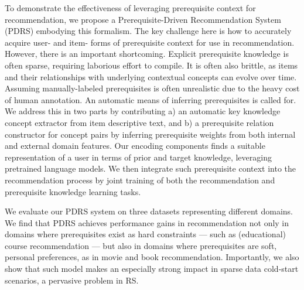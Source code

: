 To demonstrate the effectiveness of leveraging prerequisite context for recommendation, we propose a Prerequisite-Driven Recommendation System (PDRS) embodying this  formalism. 
The key challenge here is how to accurately acquire user- and item- forms of prerequisite context for use in recommendation. 
However, there is an important shortcoming.  Explicit prerequisite knowledge is often sparse, requiring laborious effort to compile.  It is often also brittle, as items and their relationships with underlying contextual concepts can evolve over time.  
Assuming manually-labeled prerequisites \cite{vuong2011method,talukdar2012crowdsourced} is often unrealistic due to the heavy cost of human annotation.  An automatic means of inferring prerequisites is called for.
We address this in two parts by contributing a) an automatic key knowledge concept extractor from item descriptive text, and b) a prerequisite relation constructor for concept pairs by inferring prerequisite weights from both internal and external domain features.
Our encoding components finds a suitable representation of a user in terms of prior and target knowledge, leveraging pretrained language models. We then integrate such prerequisite context into the recommendation process by joint training of both the recommendation and prerequisite knowledge learning tasks.

We evaluate our PDRS system on three datasets representing different domains. We find that PDRS achieves performance gains in recommendation not only in domains where prerequisites exist as hard constraints --- such as (educational) course recommendation --- but also in domains where prerequisites are soft, personal preferences, as in movie and book recommendation. Importantly, we also show that such model makes an especially strong impact in sparse data cold-start scenarios, a pervasive problem in RS. 

